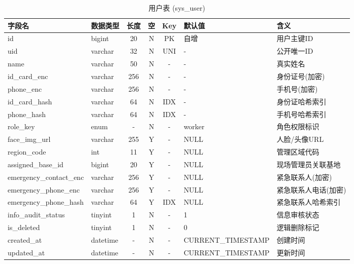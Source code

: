 \documentclass[UTF8,a4paper,12pt]{article}
\begin{document}
\begin{table}[H]
    \centering
    \caption{用户表 (sys\_user)}
    \label{tab:sys_user}
    \small %
    \renewcommand{\arraystretch}{1.3} %
    \begin{tabular}{|l|l|c|c|c|l|l|}
        \hline
        \rowcolor{gray!15} \textbf{字段名} & \textbf{数据类型} & \textbf{长度} & \textbf{空} & \textbf{Key} & \textbf{默认值} & \textbf{含义} \\ \hline
        id & bigint & 20 & N & PK & 自增 & 用户主键ID \\ \hline
        uid & varchar & 32 & N & UNI & - & 公开唯一ID \\ \hline
        name & varchar & 50 & N & - & - & 真实姓名 \\ \hline
        id\_card\_enc & varchar & 256 & N & - & - & 身份证号(加密) \\ \hline
        phone\_enc & varchar & 256 & N & - & - & 手机号(加密) \\ \hline
        id\_card\_hash & varchar & 64 & N & IDX & - & 身份证哈希索引 \\ \hline
        phone\_hash & varchar & 64 & N & IDX & - & 手机号哈希索引 \\ \hline
        role\_key & enum & - & N & - & worker & 角色权限标识 \\ \hline
        face\_img\_url & varchar & 255 & Y & - & NULL & 人脸/头像URL \\ \hline
        region\_code & int & 11 & Y & - & NULL & 管理区域代码 \\ \hline
        assigned\_base\_id & bigint & 20 & Y & - & NULL & 现场管理员关联基地 \\ \hline
        emergency\_contact\_enc & varchar & 256 & Y & - & NULL & 紧急联系人(加密) \\ \hline
        emergency\_phone\_enc & varchar & 256 & Y & - & NULL & 紧急联系人电话(加密) \\ \hline
        emergency\_phone\_hash & varchar & 64 & Y & IDX & NULL & 紧急联系人哈希索引 \\ \hline
        info\_audit\_status & tinyint & 1 & N & - & 1 & 信息审核状态 \\ \hline
        is\_deleted & tinyint & 1 & N & - & 0 & 逻辑删除标记 \\ \hline
        created\_at & datetime & - & N & - & CURRENT\_TIMESTAMP & 创建时间 \\ \hline
        updated\_at & datetime & - & N & - & CURRENT\_TIMESTAMP & 更新时间 \\ \hline
    \end{tabular}
\end{table}
\end{document}
